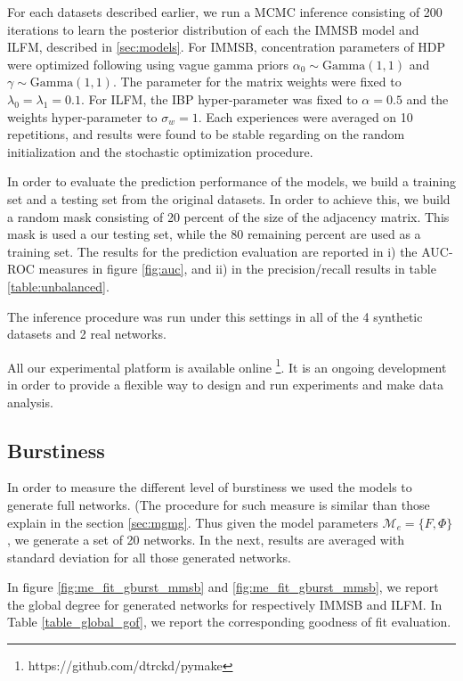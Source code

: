 \documentclass[a4paper, 12pt]{article}
\begin{document}
For each datasets described earlier, we run a MCMC inference consisting of 200 iterations to learn the posterior distribution of each the IMMSB model and ILFM, described in \ref{sec:models}. For IMMSB, concentration parameters of HDP were optimized following \cite{HDP} using vague gamma priors $\alpha_0 \sim \text{Gamma}(1,1)$ and $\gamma \sim \text{Gamma}(1,1)$. The parameter for the matrix weights were fixed to $\lambda_0=\lambda_1=0.1$. For ILFM, the IBP hyper-parameter was fixed to $\alpha=0.5$ and the weights hyper-parameter to $\sigma_w = 1$. Each experiences were averaged on 10 repetitions, and results were found to be stable regarding on the random  initialization and the stochastic optimization procedure. 
 

In order to evaluate the  prediction performance of the models, we build a training set and a testing set from the original datasets. In order to achieve this, we build a random mask consisting of 20 percent of the size of the adjacency matrix. This mask is used a our testing set, while the 80 remaining percent are used as a training set. The results for the prediction evaluation are reported in i) the AUC-ROC measures in figure \ref{fig:auc}, and ii) in the precision/recall results in table \ref{table:unbalanced}.

The inference procedure was run under this settings in all of the 4 synthetic datasets and 2 real networks.

All our experimental platform is available online \footnote{https://github.com/dtrckd/pymake}. It is an ongoing development in order to provide a flexible way to design and run experiments and make data analysis.






\subsection{Burstiness}

In order to measure the different level of burstiness we used the models to generate full networks. (The procedure for such measure is similar than those explain in the section \ref{sec:mgmg}. Thus given the model parameters $\mathcal{M}_e = \{F ,\Phi\}$, we generate a set of 20 networks. In the next, results are averaged  with standard deviation for all those generated networks.

In figure \ref{fig:me_fit_gburst_mmsb} and \ref{fig:me_fit_gburst_mmsb}, we report the global degree for generated networks for respectively IMMSB and ILFM. In Table \ref{table_global_gof}, we report the corresponding goodness of fit evaluation.
\end{document}
